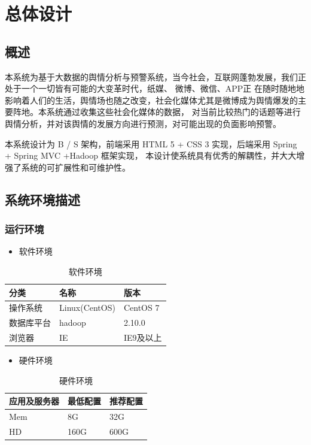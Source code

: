 \section{总体设计}
\subsection{概述}
本系统为基于大数据的舆情分析与预警系统，当今社会，互联网蓬勃发展，我们正处于一个一切皆有可能的大变革时代，纸媒、 微博、微信、APP正
在随时随地地影响着人们的生活，舆情场也随之改变，社会化媒体尤其是微博成为舆情爆发的主要阵地。本系统通过收集这些社会化媒体的数据，
对当前比较热门的话题等进行舆情分析，并对该舆情的发展方向进行预测，对可能出现的负面影响预警。

本系统设计为 B / S 架构，前端采用 HTML 5 + CSS 3 实现，后端采用 Spring + Spring MVC +Hadoop 框架实现，
本设计使系统具有优秀的解耦性，并大大增强了系统的可扩展性和可维护性。
\subsection{系统环境描述}
\subsubsection{运行环境}
\begin{itemize}
\item 软件环境
\end{itemize}

\begin{table}[!htbp]
	\centering
	\caption{软件环境}
	\label{tab:my-table}
	\begin{tabular}{|l|l|l|}
		\hline
		分类 & 名称 & 版本 \\ \hline
		操作系统 & Linux(CentOS) & CentOS 7  \\ \hline
		数据库平台 & hadoop & 2.10.0  \\ \hline
		浏览器 & IE & IE9及以上  \\ \hline
	\end{tabular}
\end{table}
\begin{itemize}
	\item 硬件环境
\end{itemize}	
\begin{table}[!htbp]
	\centering
	\caption{硬件环境}
	\label{tab:my-table1}
	\begin{tabular}{|l|l|l|}
		\hline
		应用及服务器 & 最低配置 & 推荐配置 \\ \hline
		Mem & 8G & 32G \\ \hline
		HD & 160G & 600G \\ \hline
	\end{tabular}
\end{table}
